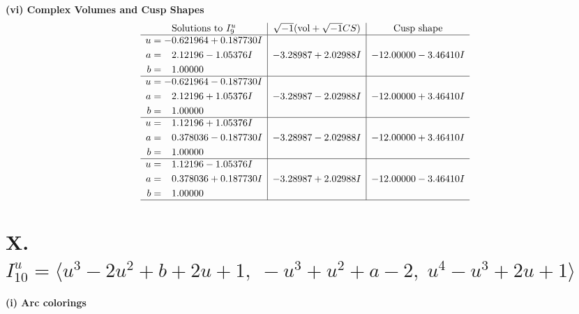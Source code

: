 \documentclass[1p]{elsarticle_modified}
\theoremstyle{definition}
\newcommand{\I}{\sqrt{-1}}
\begin{document}
\newpage\flushleft \textbf{(vi) Complex Volumes and Cusp Shapes}
$$\begin{array}{c|c|c}  
\text{Solutions to }I^u_{9}& \I (\text{vol} + \sqrt{-1}CS) & \text{Cusp shape}\\
 \hline 
\begin{aligned}
u &= -0.621964 + 0.187730 I \\
a &= \phantom{-}2.12196 - 1.05376 I \\
b &= \phantom{-}1.00000\phantom{ +0.000000I}\end{aligned}
 & -3.28987 + 2.02988 I & -12.00000 - 3.46410 I \\ \hline\begin{aligned}
u &= -0.621964 - 0.187730 I \\
a &= \phantom{-}2.12196 + 1.05376 I \\
b &= \phantom{-}1.00000\phantom{ +0.000000I}\end{aligned}
 & -3.28987 - 2.02988 I & -12.00000 + 3.46410 I \\ \hline\begin{aligned}
u &= \phantom{-}1.12196 + 1.05376 I \\
a &= \phantom{-}0.378036 - 0.187730 I \\
b &= \phantom{-}1.00000\phantom{ +0.000000I}\end{aligned}
 & -3.28987 - 2.02988 I & -12.00000 + 3.46410 I \\ \hline\begin{aligned}
u &= \phantom{-}1.12196 - 1.05376 I \\
a &= \phantom{-}0.378036 + 0.187730 I \\
b &= \phantom{-}1.00000\phantom{ +0.000000I}\end{aligned}
 & -3.28987 + 2.02988 I & -12.00000 - 3.46410 I\\
 \hline 
 \end{array}$$\newpage\newpage\renewcommand{\arraystretch}{1}
\centering \section*{X. $I^u_{10}= \langle u^3-2 u^2+b+2 u+1,\;- u^3+u^2+a-2,\;u^4- u^3+2 u+1 \rangle$}
\flushleft \textbf{(i) Arc colorings}\\
\end{document}
